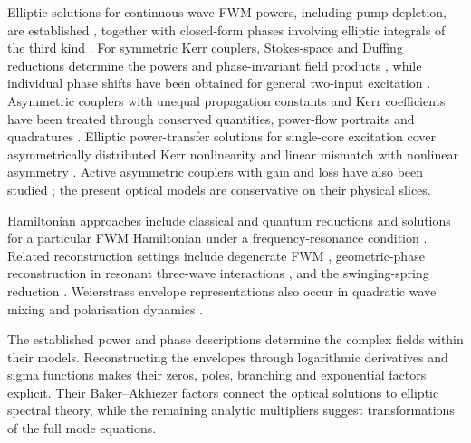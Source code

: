 \documentclass{optica-article}
\numberwithin{equation}{section}
\begin{document}
Elliptic solutions for continuous-wave FWM powers, including pump depletion, are established \cite{chenFourphotonParametricMixing1989,chenFourwaveMixingOptical1989}, together with closed-form phases involving elliptic integrals of the third kind \cite{marhicAnalyticSolutionsPhases2013}.
For symmetric Kerr couplers, Stokes-space and Duffing reductions determine the powers and phase-invariant field products \cite{dainoStabilityAnalysisNonlinear1985}, while individual phase shifts have been obtained for general two-input excitation \cite[Sections~2--5]{pengIntensitydependentPhaseShifts1990}.
Asymmetric couplers with unequal propagation constants and Kerr coefficients have been treated through conserved quantities, power-flow portraits and quadratures \cite[Section~3.B and Appendix~A]{snyderPhysicsNonlinearFiber1991}.
Elliptic power-transfer solutions for single-core excitation cover asymmetrically distributed Kerr nonlinearity \cite{karpierzNonlinearDirectionalCouplers1992} and linear mismatch with nonlinear asymmetry \cite{wangEffectsLinearMismatch2001}.
Active asymmetric couplers with gain and loss have also been studied \cite{kominisAsymmetricActiveCoupler2016}; the present optical models are conservative on their physical slices.

Hamiltonian approaches include classical and quantum reductions and solutions for a particular FWM Hamiltonian under a frequency-resonance condition \cite{odzijewiczIntegrableClassicalQuantum2020}.
Related reconstruction settings include degenerate FWM \cite{cappelliniThirdorderThreewaveMixing1991}, geometric-phase reconstruction in resonant three-wave interactions \cite{alberGeometricPhasesReduction1998}, and the swinging-spring reduction \cite{holmStepwisePrecessionResonant2002}.
Weierstrass envelope representations also occur in quadratic wave mixing and polarisation dynamics \cite{heskethGeneralComplexEnvelope2015}.

The established power and phase descriptions determine the complex fields within their models.
Reconstructing the envelopes through logarithmic derivatives and sigma functions makes their zeros, poles, branching and exponential factors explicit.
Their Baker--Akhiezer factors connect the optical solutions to elliptic spectral theory, while the remaining analytic multipliers suggest transformations of the full mode equations.
\end{document}
